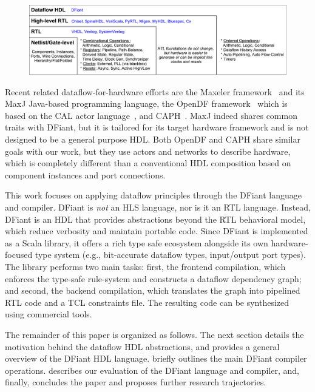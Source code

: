 \begin{figure}[t]
	\centering
	\captionsetup{justification=centering}
	\includegraphics[width=\linewidth]{graphics/motivation.pdf} 
	\label{fig:motivation}
\end{figure}

Recent related dataflow-for-hardware efforts are the Maxeler framework~\cite{Pell2011} and its MaxJ Java-based programming language, the OpenDF framework~\cite{bhattacharyya2008opendf} which is based on the CAL actor language~\cite{eker2003cal}, and CAPH~\cite{serot2011implementing}. MaxJ indeed shares common traits with DFiant, but it is tailored for its target hardware framework and is not designed to be a general purpose HDL. Both OpenDF and CAPH share similar goals with our work, but they use actors and networks to describe hardware, which is completely different than a conventional HDL composition based on component instances and port connections.

This work focuses on applying dataflow principles through the DFiant language and compiler. DFiant is \emph{not} an HLS language, nor is it an RTL language. Instead, DFiant is an HDL that provides abstractions beyond the RTL behavioral model, which reduce verbosity and maintain portable code. Since DFiant is implemented as a Scala library, it offers a rich type safe ecosystem alongside its own hardware-focused type system (e.g., bit-accurate dataflow types, input/output port types). The library performs two main tasks: first, the frontend compilation, which enforces the type-safe rule-system and constructs a dataflow dependency graph; and second, the backend compilation, which translates the graph into pipelined RTL code and a TCL constraints file. The resulting code can be synthesized using commercial tools. 

The remainder of this paper is organized as follows. The next section details the motivation behind the dataflow HDL abstractions, and  provides a general overview of the DFiant HDL language. 
 briefly outlines the main DFiant compiler operations.
 describes our evaluation of the DFiant language and compiler, and, finally,  concludes the paper and proposes further research trajectories.

 